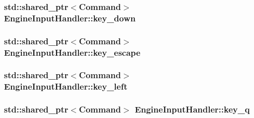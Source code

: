 \subsubsection[{key\+\_\+down}]{\setlength{\rightskip}{0pt plus 5cm}std\+::shared\+\_\+ptr$<${\bf Command}$>$ Engine\+Input\+Handler\+::key\+\_\+down\hspace{0.3cm}{\ttfamily [private]}}\label{class_engine_input_handler_a6812313632a9cf68132b99b4179ab1a4}
\hypertarget{class_engine_input_handler_a864479881a1e214952f4a2aea3a307bf}{}
\subsubsection[{key\+\_\+escape}]{\setlength{\rightskip}{0pt plus 5cm}std\+::shared\+\_\+ptr$<${\bf Command}$>$ Engine\+Input\+Handler\+::key\+\_\+escape\hspace{0.3cm}{\ttfamily [private]}}\label{class_engine_input_handler_a864479881a1e214952f4a2aea3a307bf}
\hypertarget{class_engine_input_handler_ae23b9a5cdfe4e076ca5337e5e4e17100}{}
\subsubsection[{key\+\_\+left}]{\setlength{\rightskip}{0pt plus 5cm}std\+::shared\+\_\+ptr$<${\bf Command}$>$ Engine\+Input\+Handler\+::key\+\_\+left\hspace{0.3cm}{\ttfamily [private]}}\label{class_engine_input_handler_ae23b9a5cdfe4e076ca5337e5e4e17100}
\hypertarget{class_engine_input_handler_a87304a132a8502abc0d4b74abf104bfe}{}
\subsubsection[{key\+\_\+q}]{\setlength{\rightskip}{0pt plus 5cm}std\+::shared\+\_\+ptr$<${\bf Command}$>$ Engine\+Input\+Handler\+::key\+\_\+q\hspace{0.3cm}{\ttfamily [private]}}\label{class_engine_input_handler_a87304a132a8502abc0d4b74abf104bfe}
\hypertarget{class_engine_input_handler_ad74ef644e2130ed5552173993a358b20}{}
